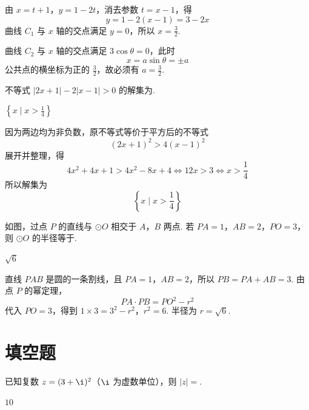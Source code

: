 \begin{solution}
由 \(x=t+1\)，\(y=1-2t\)，消去参数 \(t=x-1\)，得
\[
y=1-2(x-1)=3-2x
\]
曲线 \(C_1\) 与 \(x\) 轴的交点满足 \(y=0\)，所以 \(x=\frac32\).

曲线 \(C_2\) 与 \(x\) 轴的交点满足 \(3\cos\theta=0\)，此时
\[
x=a\sin\theta=\pm a
\]
公共点的横坐标为正的 \(\frac32\)，故必须有 \(a=\frac32\).
\end{solution}

\begin{problem}
不等式 \(|2x+1|-2|x-1|>0\) 的解集为\fillinblank{}.
\end{problem}

\begin{answer}
\(\left\{x\mid x>\frac{1}{4}\right\}\)
\end{answer}

\begin{solution}
因为两边均为非负数，原不等式等价于平方后的不等式
\[
(2x+1)^2>4(x-1)^2
\]
展开并整理，得
\[
4x^2+4x+1>4x^2-8x+4
\iff12x>3
\iff x>\frac14
\]
所以解集为
\[
\left\{x\mid x>\frac14\right\}
\]
\end{solution}

\begin{problem}
如图，过点 \(P\) 的直线与 \(\odot O\) 相交于 \(A\)，\(B\) 两点. 若 \(PA=1\)，\(AB=2\)，\(PO=3\)，则 \(\odot O\) 的半径等于\fillinblank{}.

\end{problem}

\begin{answer}
\(\sqrt{6}\)
\end{answer}

\begin{solution}
直线 \(PAB\) 是圆的一条割线，且 \(PA=1\)，\(AB=2\)，所以 \(PB=PA+AB=3\). 由点 \(P\) 的幂定理，
\[
PA\cdot PB=PO^2-r^2
\]
代入 \(PO=3\)，得到
\(1\times3=3^2-r^2\)，\(r^2=6\).
半径为 \(r=\sqrt6\).
\end{solution}

\section{填空题}

\begin{problem}
已知复数 \(z=(3+\i)^2\)（\(\i\) 为虚数单位），则 \(|z|=\)\fillinblank{}.
\end{problem}

\begin{answer}
\(10\)
\end{answer}


